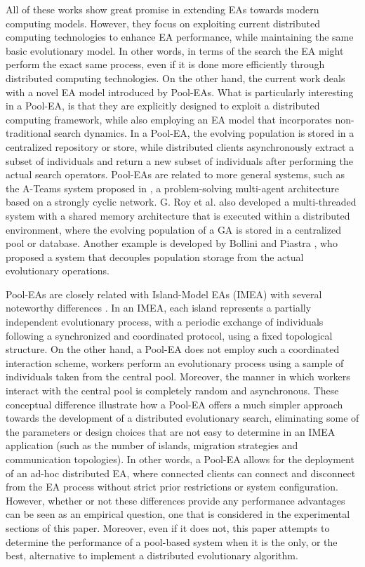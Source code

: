 All of these works show great promise in extending EAs towards modern computing models.
However, they focus on exploiting current distributed computing technologies to enhance EA performance, while maintaining the same basic evolutionary model.
In other words, in terms of the search the EA might perform the exact same process, even if it is done more efficiently through distributed computing technologies.
On the other hand, the current work deals with a novel EA model introduced by Pool-EAs.
What is particularly interesting in a Pool-EA, is that they are explicitly designed to exploit a distributed computing framework, while also employing
an EA model that incorporates non-traditional search dynamics.
In a Pool-EA, the evolving population is stored in a centralized repository or store, while distributed clients asynchronously extract a subset
of individuals and return a new subset of individuals after performing the actual search operators.
Pool-EAs are related to more general systems, such as the A-Teams system proposed in \cite{ateam}, a problem-solving multi-agent architecture based on a strongly cyclic network.
G. Roy et al. \cite{roy:2009} also developed a multi-threaded system with a shared memory architecture
that is executed within a distributed environment, where the evolving population of a GA is stored in a centralized pool or database.
Another example is developed by Bollini and Piastra \cite{bollini:1999}, who proposed a system that decouples population storage from the actual evolutionary operations.

Pool-EAs are closely related with Island-Model EAs (IMEA) \cite{cantu} with several noteworthy differences \cite{PoolvsIsland}.
In an IMEA, each island represents a partially independent evolutionary process, with a periodic exchange of
individuals following a synchronized and coordinated protocol, using a fixed topological structure.
On the other hand, a Pool-EA does not employ such a coordinated interaction scheme, workers perform an evolutionary process
using a sample of individuals taken from the central pool.
Moreover, the manner in which workers interact with the central pool is completely random and asynchronous.
These conceptual difference illustrate how a Pool-EA offers a much simpler approach towards the development of a distributed evolutionary
search, eliminating some of the parameters or design choices that are not easy to determine in an IMEA application
(such as the number of islands, migration strategies and communication topologies).
In other words, a Pool-EA allows for the deployment of an ad-hoc distributed EA, where connected clients can connect and disconnect from the
EA process without strict prior restrictions or system configuration.
However, whether or not these differences provide any performance advantages can be seen as an empirical question, one that is considered
in the experimental sections of this paper.
Moreover, even if it does not, this paper attempts to determine the performance of a pool-based system when it is the only, or the best,
alternative to implement a distributed evolutionary algorithm.

